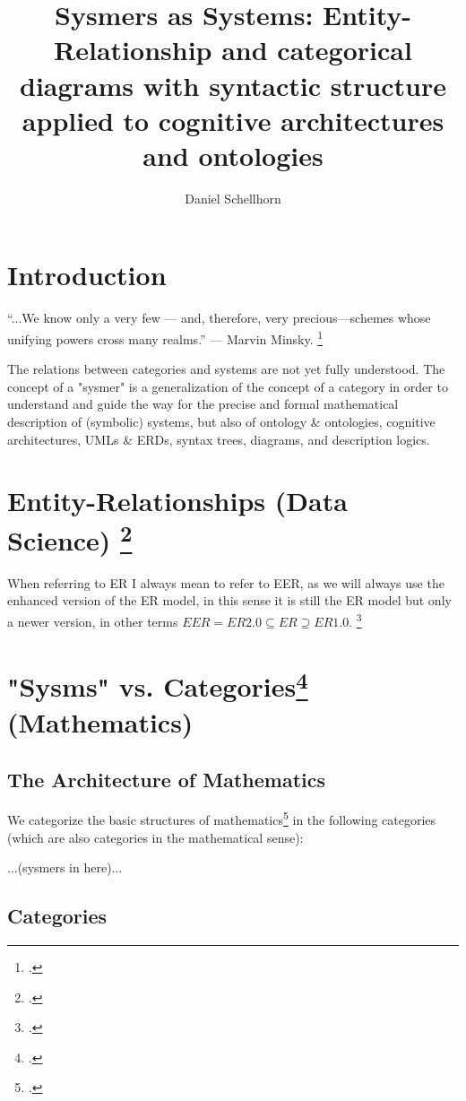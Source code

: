 \documentclass[12pt,a4paper]{article}
\title{Sysmers as Systems: Entity-Relationship and categorical diagrams with syntactic structure applied to cognitive architectures and ontologies}
\author{Daniel Schellhorn}
\begin{document}
\maketitle

\section*{Introduction}
“...We know only a very few — and, therefore, very precious—schemes whose unifying powers cross many realms.” — Marvin Minsky. \footcite[?]{Minsky1988}
\newline

The relations between categories and systems are not yet fully understood. The concept of a "sysmer" is a generalization of the concept of a category in order to understand and guide the way for the precise and formal mathematical description of (symbolic) systems, but also of ontology \& ontologies, cognitive architectures, UMLs \& ERDs, syntax trees, diagrams, and description logics.

\section{Entity-Relationships (Data Science) \footcite{ElmasriNavathe2015}}

When referring to ER I always mean to refer to EER, as we will always use the enhanced version of the ER model, in this sense it is still the ER model but only a newer version, in other terms $EER = ER 2.0 \subseteq ER \supseteq ER 1.0 $. \footcite[107]{ElmasriNavathe2015}

\section{"Sysms" vs. Categories\footcite{MacLane1997} (Mathematics)}

\subsection{The Architecture of Mathematics}
We categorize the basic structures of mathematics\footcite[68]{Basieux2000} in the following categories (which are also categories in the mathematical sense):

...(sysmers in here)...

\subsection{Categories}
\end{document}
